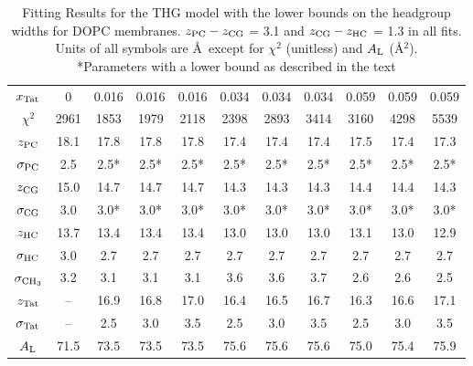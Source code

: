 \begin{table}[htbp]
  \centering
  \begin{tabular}{c|c|ccc|ccc|ccc}
  \hline 
    $x_\textrm{Tat}$ & 0  &    0.016 & 0.016 & 0.016 & 0.034 & 0.034 & 0.034 & 0.059 & 0.059 & 0.059 \\
    $\chi^2$ & 2961 &    1853 & 1979 & 2118 & 2398 & 2893 & 3414    & 3160 & 4298 & 5539 \\   
    $z_\textrm{PC}$ & 18.1   &    17.8 & 17.8 & 17.8 & 17.4 & 17.4 & 17.4    & 17.5 & 17.4 & 17.3 \\   
    $\sigma_\textrm{PC}$  & 2.5 &   2.5* &  2.5* &  2.5* & 2.5* & 2.5* & 2.5*       & 2.5* & 2.5* & 2.5* \\      
    $z_\textrm{CG}$   & 15.0 &    14.7 & 14.7 & 14.7 & 14.3 & 14.3 & 14.3    & 14.4 & 14.4 & 14.3 \\   
    $\sigma_\textrm{CG}$ & 3.0 &    3.0* &  3.0* &  3.0* & 3.0* & 3.0* & 3.0* & 3.0* & 3.0* & 3.0* \\      
    $z_\textrm{HC}$ & 13.7 &     13.4 & 13.4 & 13.4  & 13.0 & 13.0 & 13.0    & 13.1 & 13.0 & 12.9 \\   
    $\sigma_\textrm{HC}$ &      3.0 &2.7 & 2.7 & 2.7  & 2.7 & 2.7 & 2.7       & 2.7 & 2.7 & 2.7 \\      
    $\sigma_{\textrm{CH}_3}$ & 3.2 & 3.1 & 3.1 & 3.1 & 3.6 & 3.6 & 3.7       & 2.6 & 2.6 & 2.5 \\      
    $z_\textrm{Tat}$ & -- &          16.9 & 16.8 & 17.0 & 16.4 & 16.5 & 16.7    & 16.3 & 16.6 & 17.1 \\   
    $\sigma_\textrm{Tat}$ & -- &         2.5 & 3.0 & 3.5 & 2.5 & 3.0 & 3.5       & 2.5 & 3.0 & 3.5 \\      
    $A_\textrm{L}$ & 71.5 &       73.5 & 73.5 & 73.5 & 75.6 & 75.6 & 75.6    & 75.0 & 75.4 & 75.9 \\    
  \hline
  \end{tabular}
  \caption{Fitting Results for the THG model with the lower bounds on the headgroup
  widths for DOPC membranes. 
  $z_\textrm{PC}-z_\textrm{CG}$ = 3.1 and $z_\textrm{CG}-z_\textrm{HC}$ = 1.3 in all fits. 
  Units of all symbols are \AA\ except for $\chi^2$ (unitless) and $A_\textrm{L}$ (\AA$^2$).  
  \\
  *Parameters with a lower bound as described in the text}
  \label{tab:bound_DOPC}
\end{table}

